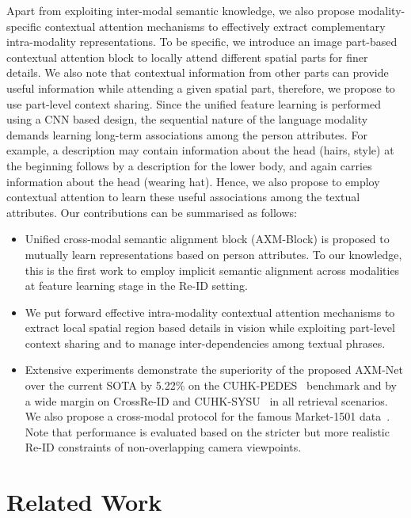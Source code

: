 \documentclass[10pt,twocolumn,letterpaper]{article}
\begin{document}
 Apart from exploiting inter-modal semantic knowledge, we also propose modality-specific contextual attention mechanisms to effectively extract complementary intra-modality representations. To be specific, we introduce an image part-based contextual attention block to locally attend different spatial parts for finer details. We also note that contextual information from other parts can provide useful information while attending a given spatial part, therefore, we propose to use part-level context sharing. Since the unified feature learning is performed using a CNN based design, the sequential nature of the language modality demands learning long-term associations among the person attributes. For example, a description may contain information about the head (hairs, style) at the beginning follows by a description for the lower body, and again carries information about the head (wearing hat). Hence, we also propose to employ contextual attention to learn these useful associations among the textual attributes.
 Our contributions can be summarised as follows:
 \begin{itemize}[noitemsep,nolistsep,itemindent=0pt,leftmargin=7pt]
     \item Unified cross-modal semantic alignment block (AXM-Block) is proposed to mutually learn representations based on person attributes. To our knowledge, this is the first work to employ implicit semantic alignment across modalities at feature learning stage in the Re-ID setting.
     \item We put forward effective intra-modality contextual attention mechanisms to extract local spatial region based details in vision while exploiting part-level context sharing and to manage inter-dependencies among textual phrases.
     \item Extensive experiments demonstrate the superiority 
     of the proposed AXM-Net over the current SOTA by 5.22\% on the CUHK-PEDES~\cite{li2017person} benchmark and by a wide margin on CrossRe-ID and CUHK-SYSU~\cite{farooq2020convolutional,farooq2020IJCB} in all retrieval scenarios. We also propose a cross-modal protocol for the famous Market-1501 data~\cite{zheng2015scalable}. Note that performance is evaluated based on the stricter but more realistic Re-ID constraints of non-overlapping camera viewpoints. 
 \end{itemize}
 





\section{Related Work}
\end{document}
